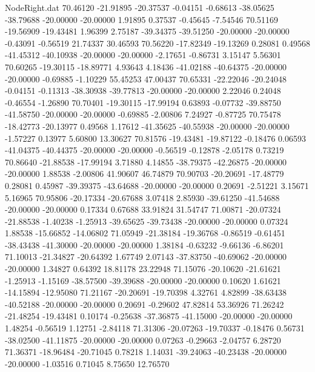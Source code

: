 \begin{filecontents}{NodeRight.dat}
  70.46120  -21.91895  -20.37537    -0.04151   -0.68613  -38.05625  -38.79688  -20.00000  -20.00000    1.91895    0.37537   -0.45645   -7.54546
  70.51169  -19.56909  -19.43481     1.96399    2.75187  -39.34375  -39.51250  -20.00000  -20.00000   -0.43091   -0.56519   21.74337   30.46593
  70.56220  -17.82349  -19.13269     0.28081    0.49568  -41.45312  -40.10938  -20.00000  -20.00000   -2.17651   -0.86731    3.15147    5.56301
  70.60265  -19.30115  -18.89771     4.93643    4.18436  -41.02188  -40.64375  -20.00000  -20.00000   -0.69885   -1.10229   55.45253   47.00437
  70.65331  -22.22046  -20.24048    -0.04151   -0.11313  -38.30938  -39.77813  -20.00000  -20.00000    2.22046    0.24048   -0.46554   -1.26890
  70.70401  -19.30115  -17.99194     0.63893   -0.07732  -39.88750  -41.58750  -20.00000  -20.00000   -0.69885   -2.00806    7.24927   -0.87725
  70.75478  -18.42773  -20.13977     0.49568    1.17612  -41.35625  -40.55938  -20.00000  -20.00000   -1.57227    0.13977    5.60800   13.30627
  70.81576  -19.43481  -19.87122    -0.18476    0.06593  -41.04375  -40.44375  -20.00000  -20.00000   -0.56519   -0.12878   -2.05178    0.73219
  70.86640  -21.88538  -17.99194     3.71880    4.14855  -38.79375  -42.26875  -20.00000  -20.00000    1.88538   -2.00806   41.90607   46.74879
  70.90703  -20.20691  -17.48779     0.28081    0.45987  -39.39375  -43.64688  -20.00000  -20.00000    0.20691   -2.51221    3.15671    5.16965
  70.95806  -20.17334  -20.67688     3.07418    2.85930  -39.61250  -41.54688  -20.00000  -20.00000    0.17334    0.67688   33.91824   31.54747
  71.00871  -20.07324  -21.88538    -1.40238   -1.25913  -39.65625  -39.73438  -20.00000  -20.00000    0.07324    1.88538  -15.66852  -14.06802
  71.05949  -21.38184  -19.36768    -0.86519   -0.61451  -38.43438  -41.30000  -20.00000  -20.00000    1.38184   -0.63232   -9.66136   -6.86201
  71.10013  -21.34827  -20.64392     1.67749    2.07143  -37.83750  -40.69062  -20.00000  -20.00000    1.34827    0.64392   18.81178   23.22948
  71.15076  -20.10620  -21.61621    -1.25913   -1.15169  -38.57500  -39.39688  -20.00000  -20.00000    0.10620    1.61621  -14.15894  -12.95080
  71.21167  -20.20691  -19.70398     4.32761    4.82899  -38.63438  -40.52188  -20.00000  -20.00000    0.20691   -0.29602   47.82814   53.36926
  71.26242  -21.48254  -19.43481     0.10174   -0.25638  -37.36875  -41.15000  -20.00000  -20.00000    1.48254   -0.56519    1.12751   -2.84118
  71.31306  -20.07263  -19.70337    -0.18476    0.56731  -38.02500  -41.11875  -20.00000  -20.00000    0.07263   -0.29663   -2.04757    6.28720
  71.36371  -18.96484  -20.71045     0.78218    1.14031  -39.24063  -40.23438  -20.00000  -20.00000   -1.03516    0.71045    8.75650   12.76570

\end{filecontents}
